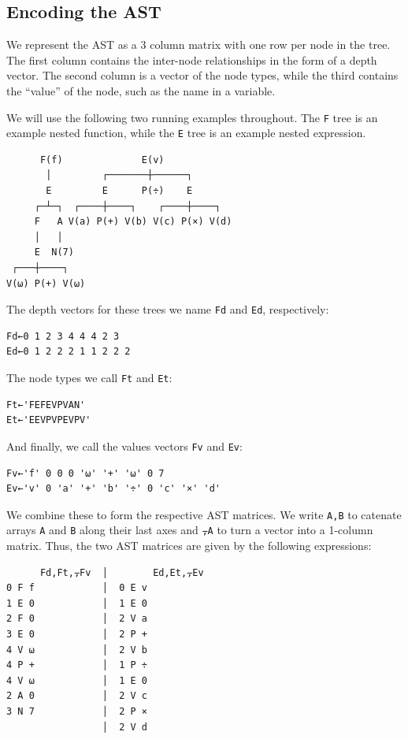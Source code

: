 ﻿\documentclass[numbers,10pt,preprint]{sigplanconf}
\begin{document}
\subsection{Encoding the AST}

We represent the AST as a 3 column matrix with one row per node in the tree. The first column contains the inter-node relationships in the form of a depth vector. The second column is a vector of the node types, while the third contains the ``value'' of the node, such as the name in a variable.

We will use the following two running examples throughout. The \verb;F; tree is an example nested function, while the \verb;E; tree is an example nested expression.

\begin{verbatim}
      F(f)              E(v)
       │         ┌───────┼──────┐
       E         E      P(÷)    E
     ┌─┴─┐  ┌────┼────┐    ┌────┼────┐
     F   A V(a) P(+) V(b) V(c) P(×) V(d)
     │   │
     E  N(7) 
 ┌───┼────┐
V(⍵) P(+) V(⍵)
\end{verbatim}

\noindent
The depth vectors for these trees we name \verb;Fd; and \verb;Ed;, respectively:

\begin{verbatim}
Fd←0 1 2 3 4 4 4 2 3
Ed←0 1 2 2 2 1 1 2 2 2
\end{verbatim}

\noindent
The node types we call \verb;Ft; and \verb;Et;:

\begin{verbatim}
Ft←'FEFEVPVAN'
Et←'EEVPVPEVPV'
\end{verbatim}

\noindent
And finally, we call the values vectors \verb;Fv; and \verb;Ev;:

\begin{verbatim}
Fv←'f' 0 0 0 '⍵' '+' '⍵' 0 7
Ev←'v' 0 'a' '+' 'b' '÷' 0 'c' '×' 'd'
\end{verbatim}

\noindent We combine these to form the respective AST matrices. We write \verb;A,B; to catenate arrays \verb;A; and \verb;B; along their last axes and \verb;⍪A; to turn a vector into a 1-column matrix. Thus, the two AST matrices are given by the following expressions:

\begin{verbatim}
      Fd,Ft,⍪Fv  │        Ed,Et,⍪Ev
0 F f            │  0 E v
1 E 0            │  1 E 0
2 F 0            │  2 V a
3 E 0            │  2 P +
4 V ⍵            │  2 V b
4 P +            │  1 P ÷
4 V ⍵            │  1 E 0
2 A 0            │  2 V c
3 N 7            │  2 P ×
                 │  2 V d
\end{verbatim}
\end{document}
